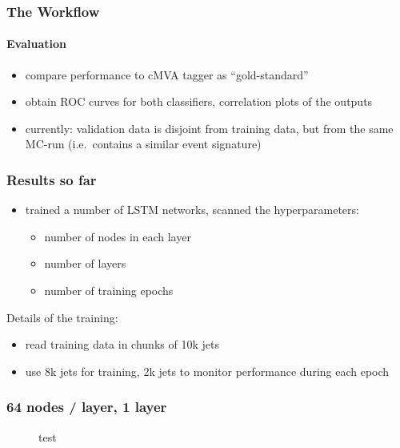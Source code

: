 \documentclass{beamer}
\begin{document}
\begin{frame}
  \frametitle{The Workflow}
  \framesubtitle{Evaluation}
  \begin{itemize}
  \item compare performance to cMVA tagger as ``gold-standard''
  \item obtain ROC curves for both classifiers, correlation plots of the outputs
  \item currently: validation data is disjoint from training data, but from the same MC-run (i.e.~contains a similar event signature)
  \end{itemize}

\end{frame}

\begin{frame}
  \frametitle{Results so far}
  \begin{itemize}
  \item trained a number of LSTM networks, scanned the hyperparameters:
    \begin{itemize}
    \item number of nodes in each layer
    \item number of layers
    \item number of training epochs
    \end{itemize}
  \end{itemize}
  
  Details of the training:
  \begin{itemize}
  \item read training data in chunks of 10k jets
  \item use 8k jets for training, 2k jets to monitor performance during each epoch
  \end{itemize}
\end{frame}

\begin{frame}
  \frametitle{64 nodes / layer, 1 layer}

    \begin{figure}[htb]
    \centering

    \caption{test}
  \end{figure}

\end{frame}
\end{document}
